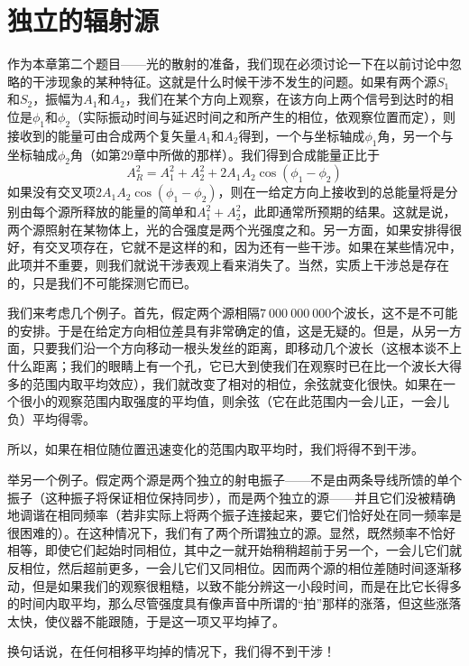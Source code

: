 \section{独立的辐射源}

作为本章第二个题目——光的散射的准备，我们现在必须讨论一下在以前讨论中忽略的干涉现象的某种特征。这就是什么时候干涉不发生的问题。如果有两个源$S_1$和$S_2$，振幅为$A_1$和$A_2$，我们在某个方向上观察，在该方向上两个信号到达时的相位是$\phi_1$和$\phi_2$（实际振动时间与延迟时间之和所产生的相位，依观察位置而定），则接收到的能量可由合成两个复矢量$A_1$和$A_2$得到，一个与坐标轴成$\phi_1$角，另一个与坐标轴成$\phi_2$角（如第29章中所做的那样）。我们得到合成能量正比于
\begin{equation}
    \label{Eq:I:32:14}
    A_R^2=A_1^2 + A_2^2 + 2A_1A_2\cos(\phi_1-\phi_2)
\end{equation}
如果没有交叉项$2A_1A_2\cos(\phi_1-\phi_2)$，则在一给定方向上接收到的总能量将是分别由每个源所释放的能量的简单和$A_1^2 + A_2^2$，此即通常所预期的结果。这就是说，两个源照射在某物体上，光的合强度是两个光强度之和。另一方面，如果安排得很好，有交叉项存在，它就不是这样的和，因为还有一些干涉。如果在某些情况中，此项并不重要，则我们就说干涉表观上看来消失了。当然，实质上干涉总是存在的，只是我们不可能探测它而已。

我们来考虑几个例子。首先，假定两个源相隔$7~000~000~000$个波长，这不是不可能的安排。于是在给定方向相位差具有非常确定的值，这是无疑的。但是，从另一方面，只要我们沿一个方向移动一根头发丝的距离，即移动几个波长（这根本谈不上什么距离；我们的眼睛上有一个孔，它已大到使我们在观察时已在比一个波长大得多的范围内取平均效应），我们就改变了相对的相位，余弦就变化很快。如果在一个很小的观察范围内取强度的平均值，则余弦（它在此范围内一会儿正，一会儿负）平均得零。

所以，如果在相位随位置迅速变化的范围内取平均时，我们将得不到干涉。

举另一个例子。假定两个源是两个独立的射电振子——不是由两条导线所馈的单个振子（这种振子将保证相位保持同步），而是两个独立的源——并且它们没被精确地调谐在相同频率（若非实际上将两个振子连接起来，要它们恰好处在同一频率是很困难的）。在这种情况下，我们有了两个所谓独立的源。显然，既然频率不恰好相等，即使它们起始时同相位，其中之一就开始稍稍超前于另一个，一会儿它们就反相位，然后超前更多，一会儿它们又同相位。因而两个源的相位差随时间逐渐移动，但是如果我们的观察很粗糙，以致不能分辨这一小段时间，而是在比它长得多的时间内取平均，那么尽管强度具有像声音中所谓的“拍”那样的涨落，但这些涨落太快，使仪器不能跟随，于是这一项又平均掉了。

换句话说，在任何相移平均掉的情况下，我们得不到干涉！

